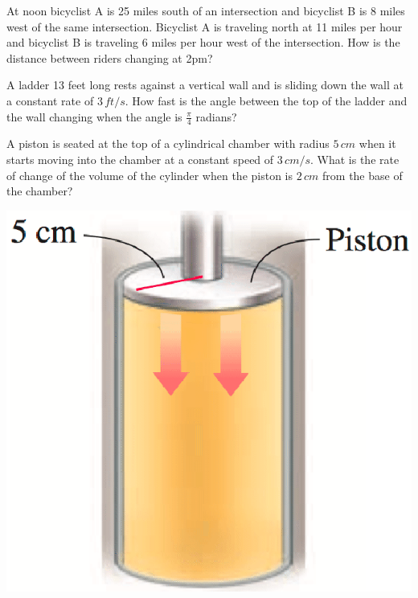 \documentclass[../mathNotesPreamble]{subfiles}
\begin{document}
\begin{ex*}
  At noon bicyclist A is 25 miles south of an intersection and bicyclist B is 8 miles west of the same intersection. Bicyclist A is traveling north at 11 miles per hour and bicyclist B is traveling 6 miles per hour west of the intersection. How is the distance between riders changing at 2pm?
\end{ex*}
\pagebreak

\begin{ex*}
  A ladder 13 feet long rests against a vertical wall and is sliding down the wall at a constant rate of $3\,ft/s$. How fast is the angle between the top of the ladder and the wall changing when the angle is $\frac{\pi}{4}$ radians?
\end{ex*}
\pagebreak

\noindent
\begin{minipage}[t]{0.7\linewidth}\mbox{}
  \begin{ex*}
    A piston is seated at the top of a cylindrical chamber with radius $5\,cm$ when it starts moving into the chamber at a constant speed of $3\,cm/s$. What is the rate of change of the volume of the cylinder when the piston is $2\,cm$ from the base of the chamber?
  \end{ex*}
\end{minipage}%
\begin{minipage}[t]{0.3\linewidth}\mbox{}
  \begin{flushright}
    \includegraphics[width=0.9\linewidth]{../images/briggs_03_11/piston.png}
  \end{flushright}
\end{minipage}
\pagebreak
\end{document}
